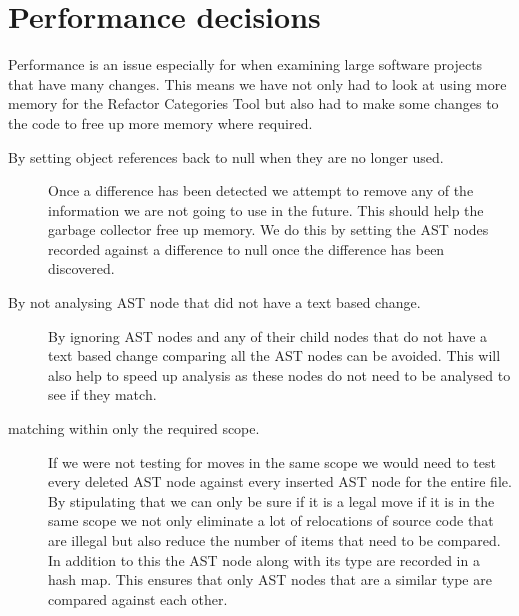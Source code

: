 


\section{Performance decisions}
Performance is an issue especially for when examining large software projects that have many changes. This means we have not only had to look at using more memory for the Refactor Categories Tool but also had to make some changes to the code to free up more memory where required.

\begin{description}
 \item [By setting object references back to null when they are no longer used.]
  Once a difference has been detected we attempt to remove any of the information we are not going to use in the future.  This should help the garbage collector free up memory. We do this by setting the AST nodes recorded against a difference to null once the difference has been discovered. 
\item [By not analysing AST node that did not have a text based change.] 
  By ignoring AST nodes and any of their child nodes that do not have a text based change comparing all the AST nodes can be avoided.  This will also help to speed up analysis as these nodes do not need to be analysed to see if they match.
\item [matching within only the required scope.]
  If we were not testing for moves in the same scope we would need to test every deleted AST node against every inserted AST node for the entire file. By stipulating that we can only be sure if it is a legal move if it is in the same scope we not only eliminate a lot of relocations of source code that are illegal but also reduce the number of items that need to be compared. In addition to this the AST node along with its type are recorded in a hash map.  This ensures that only AST nodes that are a similar type are compared against each other.
\end{description}

